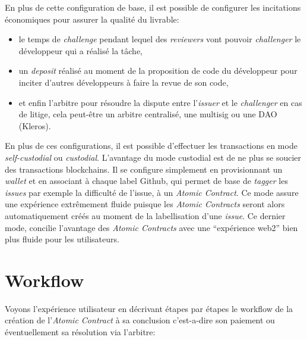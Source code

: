 \documentclass[
	a4paper, %
	10pt, %
	unnumberedsections, %
	twoside, %
]{LTJournalArticle}
\begin{document}
En plus de cette configuration de base, il est possible de configurer les incitations économiques pour assurer la qualité du livrable:

\begin{itemize}
\item
  le temps de \emph{challenge} pendant lequel des \emph{reviewers} vont pouvoir \emph{challenger} le développeur qui a réalisé la tâche,
\item
  un \emph{deposit} réalisé au moment de la proposition de code du développeur pour inciter d'autres développeurs à faire la revue de son code,
\item
  et enfin l'arbitre pour résoudre la dispute entre l'\emph{issuer} et le \emph{challenger} en cas de litige, cela peut-être un arbitre centralisé, une multisig ou une DAO (Kleros).
\end{itemize}

En plus de ces configurations, il est possible d'effectuer les transactions en mode \emph{self-custodial} ou \emph{custodial}. L'avantage du mode custodial est de ne plus se soucier des transactions blockchains. Il se configure simplement en provisionnant un \emph{wallet} et en associant à chaque label Github, qui permet de base de \emph{tagger} les \emph{issues} par exemple la difficulté de l'issue, à un \emph{Atomic Contract}. Ce mode assure une expérience extrêmement fluide puisque les \emph{Atomic Contracts} seront alors automatiquement créés au moment de la labellisation d'une \emph{issue}. Ce dernier mode, concilie l'avantage des \emph{Atomic Contracts} avec une ``expérience web2'' bien plus fluide pour les utilisateurs.


\section{Workflow}

Voyons l'expérience utilisateur en décrivant étapes par étapes le workflow de la création de l'\emph{Atomic Contract} à sa conclusion c'est-a-dire son paiement ou éventuellement sa résolution via l'arbitre:
\end{document}
